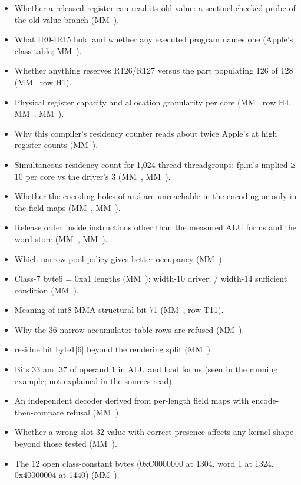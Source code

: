 \begin{itemize}
\item Whether a released register can read its old value: a sentinel-checked probe of the old-value branch (MM~).
\item What IR0-IR15 hold and whether any executed program names one (Apple's class table; MM~).
\item Whether anything reserves R126/R127 versus the part populating 126 of 128 (MM~ row H1).
\item Physical register capacity and allocation granularity per core (MM~ row H4, MM~, MM~).
\item Why this compiler's residency counter reads about twice Apple's at high register counts (MM~).
\item Simultaneous residency count for 1,024-thread threadgroups: fp.m's implied ≥ 10 per core vs the driver's 3 (MM~,
  MM~).
\item Whether the encoding holes of  and  are unreachable in the encoding or only in the field maps (MM~, MM~).
\item Release order inside instructions other than the measured ALU forms and the word store (MM~, MM~).
\item Which narrow-pool policy gives better occupancy (MM~).
\item Class-7 byte6 = 0xa1 lengths (MM~);  width-10 driver; / width-14 sufficient condition (MM~).
\item Meaning of int8-MMA structural bit 71 (MM~, row T11).
\item Why the 36 narrow-accumulator table rows are refused (MM~).
\item {} residue bit byte1{[}6{]} beyond the rendering split (MM~).
\item Bits 33 and 37 of operand 1 in ALU and load forms (seen in the running example; not explained in the sources read).
\item An independent decoder derived from per-length field maps with encode-then-compare refusal (MM~).
\item Whether a wrong slot-32 value with correct presence affects any kernel shape beyond those tested (MM~).
\item The 12 open class-constant bytes (0xC0000000 at 1304, word 1 at 1324, 0x40000004 at 1440) (MM~).

\end{itemize}
